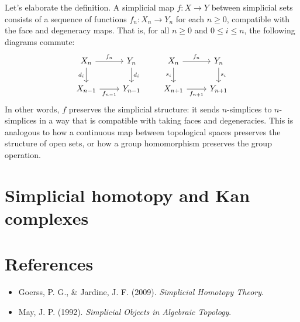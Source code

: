 \documentclass[11pt]{article}
\theoremstyle{definition}
\theoremstyle{plain}
\begin{document}
Let's elaborate the definition. A simplicial map $f : X \to Y$ between simplicial sets consists of a sequence of functions $f_n : X_n \to Y_n$ for each $n \geq 0$, compatible with the face and degeneracy maps. That is, for all $n \geq 0$ and $0 \leq i \leq n$, the following diagrams commute:
\[
    \begin{tikzcd}
        X_n \arrow[r,"f_n"] \arrow[d,"d_i"'] & Y_n \arrow[d,"d_i"] \\
        X_{n-1} \arrow[r,"f_{n-1}"'] & Y_{n-1}
    \end{tikzcd}
    \qquad
    \begin{tikzcd}
        X_n \arrow[r,"f_n"] \arrow[d,"s_i"'] & Y_n \arrow[d,"s_i"] \\
        X_{n+1} \arrow[r,"f_{n+1}"'] & Y_{n+1}
    \end{tikzcd}
\]
In other words, $f$ preserves the simplicial structure: it sends $n$-simplices to $n$-simplices in a way that is compatible with taking faces and degeneracies. This is analogous to how a continuous map between topological spaces preserves the structure of open sets, or how a group homomorphism preserves the group operation.
















\section{Simplicial homotopy and Kan complexes}










\section{References}
\begin{itemize}
    \item Goerss, P. G., \& Jardine, J. F. (2009). \emph{Simplicial Homotopy Theory}.
    \item May, J. P. (1992). \emph{Simplicial Objects in Algebraic Topology}.
\end{itemize}
\end{document}

